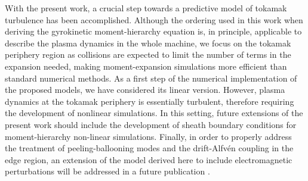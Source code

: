 With the present work, a crucial step towards a predictive model of tokamak turbulence has been accomplished.
%
Although the ordering used in this work when deriving the gyrokinetic moment-hierarchy equation is, in principle, applicable to describe the plasma dynamics in the whole machine, we focus on the tokamak periphery region as collisions are expected to limit the number of terms in the expansion needed, making moment-expansion simulations more efficient than standard numerical methods.
%
As a first step of the numerical implementation of the proposed models, we have considered its linear version.
%
However, plasma dynamics at the tokamak periphery is essentially turbulent, therefore requiring the development of nonlinear simulations.
%
In this setting, future extensions of the present work should include the development of sheath boundary conditions for moment-hierarchy non-linear simulations.
%
Finally, in order to properly address the treatment of peeling-ballooning modes and the drift-Alfvén coupling in the edge region, an extension of the model derived here to include electromagnetic perturbations will be addressed in a future publication \citep{Frei2019}.